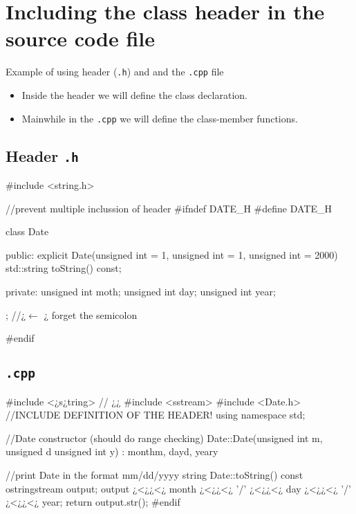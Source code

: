 \section{Including the class header in the source code file}
Example of using header (\texttt{.h}) and and the \texttt{.cpp} file\\
\begin{itemize}
    \item Inside the header we will define the class declaration.
    \item Mainwhile in the \texttt{.cpp} we will define the class-member functions.
\end{itemize}

\subsection{Header \texttt{.h}}
\begin{minipage}{\MPWxLARGExLISTING\textwidth} %
{} %
\begin{CPPCode}
#include <string.h>

//prevent multiple inclussion of header
#ifndef DATE_H
#define DATE_H

class Date{
public:
    explicit Date(unsigned int = 1, unsigned int = 1, unsigned int = 2000)
    std::string toString() const;
    
private:
    unsigned int moth;
    unsigned int day;
    unsigned int year;
}; //¿$\leftarrow$ ¿ forget the semicolon

#endif
\end{CPPCode}
\end{minipage}

\subsection{\texttt{.cpp}}
\begin{minipage}{\MPWxLARGExLISTING\textwidth} %
{} %
\begin{CPPCode}
#include <¿s¿tring> // ¿¿
#include <sstream>
#include <Date.h>   //INCLUDE DEFINITION OF THE HEADER!
using namespace std;

//Date constructor (should do range checking)
Date::Date(unsigned int m, unsigned d unsigned int y)
    : month{m}, day{d}, year{y} {}
    
//print Date in the format mm/dd/yyyy
string Date::toString() const {
    ostringstream output;
    output ¿<¿¿<¿ month ¿<¿¿<¿ '/' ¿<¿¿<¿ day ¿<¿¿<¿ '/' ¿<¿¿<¿ year;
    return output.str();
}
#endif
\end{CPPCode}
\end{minipage}

